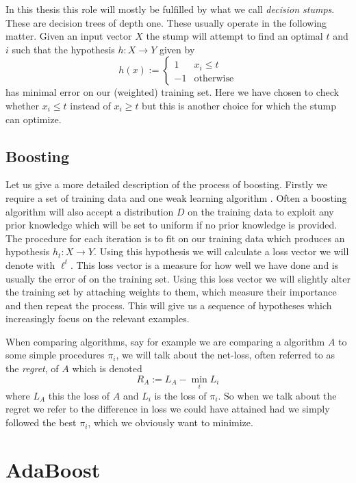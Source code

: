 \par In this thesis this role will mostly be fulfilled by what we call \textit{decision stumps}. These are decision trees of depth one. These usually operate in the following matter. Given an input vector $X$ the stump will attempt to find an optimal $t$ and $i$ such that the hypothesis $h:X\to Y$ given by $$h(x):=\begin{cases}1 &x_i\leq t \\ -1 &\text{otherwise}\end{cases}$$ has minimal error on our (weighted) training set. Here we have chosen to check whether $x_i\leq t$ instead of $x_i\geq t$ but this is another choice for which the stump can optimize. 
\newpage
\subsection{Boosting}
\label{subsec:boost}

Let us give a more detailed description of the process of boosting. Firstly we require a set of training data and one weak learning algorithm \weak. Often a boosting algorithm will also accept a distribution $D$ on the training data to exploit any prior knowledge which will be set to uniform if no prior knowledge is provided. The procedure for each iteration is to fit \weak on our training data which produces an hypothesis $h_t:X\to Y$. Using this hypothesis we will calculate a loss vector we will denote with $\ell^t$. This loss vector is a measure for how well we have done and is usually the error of \weak on the training set. Using this loss vector we will slightly alter the training set by attaching weights to them, which measure their importance and then repeat the process. This will give us a sequence of hypotheses which increasingly focus on the relevant examples.
\par When comparing algorithms, say for example we are comparing a algorithm $A$ to some simple procedures $\pi_i$, we will talk about the net-loss, often referred to as the \textit{regret}, of $A$ which is denoted  $$R_A:=L_A-\min_i L_i$$ where $L_A$ this the loss of $A$ and $L_i$ is the loss of $\pi_i$. So when we talk about the regret we refer to the difference in loss we could have attained had we simply followed the best $\pi_i$, which we obviously want to minimize.

\section{AdaBoost}
\label{sec:ada}

